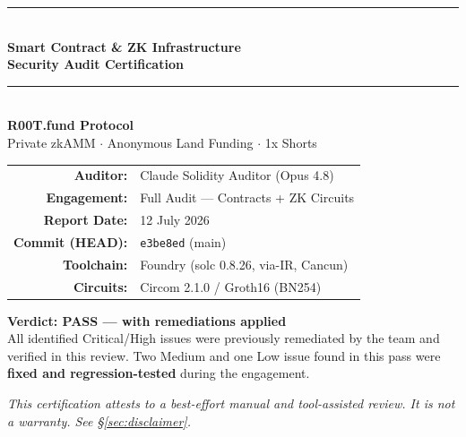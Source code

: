 \documentclass[11pt,a4paper]{article}
\newcommand{\sev}[2]{\textcolor{#1}{\textbf{#2}}}
\begin{document}
\begin{titlepage}
\centering
\vspace*{1.5cm}
{\color{r00tgreen}\rule{\textwidth}{2pt}}\\[0.4cm]
{\Huge\bfseries\color{r00tdark} Smart Contract \& ZK Infrastructure}\\[0.3cm]
{\Huge\bfseries\color{r00tgreen} Security Audit Certification}\\[0.5cm]
{\color{r00tgreen}\rule{\textwidth}{2pt}}\\[1.2cm]

{\LARGE\bfseries R00T.fund Protocol}\\[0.4cm]
{\large Private zkAMM $\cdot$ Anonymous Land Funding $\cdot$ 1x Shorts}\\[2.0cm]

\begin{tabular}{rl}
\textbf{Auditor:} & Claude Solidity Auditor (Opus 4.8) \\[4pt]
\textbf{Engagement:} & Full Audit — Contracts + ZK Circuits \\[4pt]
\textbf{Report Date:} & 12 July 2026 \\[4pt]
\textbf{Commit (HEAD):} & \texttt{e3be8ed} (main) \\[4pt]
\textbf{Toolchain:} & Foundry (solc 0.8.26, via-IR, Cancun) \\[4pt]
\textbf{Circuits:} & Circom 2.1.0 / Groth16 (BN254) \\[4pt]
\end{tabular}

\vspace{2.0cm}
\begin{tcolorbox}[colback=r00tgreen!8,colframe=r00tgreen,width=0.85\textwidth,
  arc=3pt,boxrule=1pt]
\centering\large
\textbf{Verdict: \sev{r00tgreen}{PASS — with remediations applied}}\\[4pt]
\normalsize All identified Critical/High issues were previously remediated by the
team and verified in this review. Two Medium and one Low issue found in this pass
were \textbf{fixed and regression-tested} during the engagement.
\end{tcolorbox}

\vfill
{\small\itshape This certification attests to a best-effort manual and tool-assisted
review. It is not a warranty. See \S\ref{sec:disclaimer}.}
\end{titlepage}

\tableofcontents
\newpage
\end{document}
